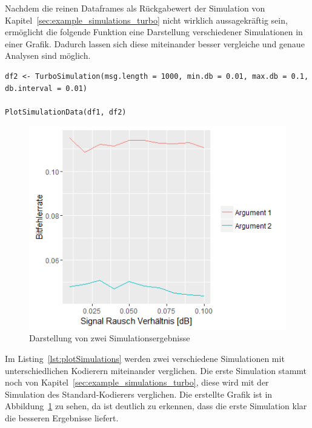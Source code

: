 Nachdem die reinen Dataframes als Rückgabewert der Simulation von Kapitel~\ref{sec:example_simulations_turbo} nicht wirklich aussagekräftig sein, ermöglicht die folgende Funktion eine Darstellung verschiedener Simulationen in einer Grafik. Dadurch lassen sich diese miteinander besser vergleiche und genaue Analysen sind möglich.

\begin{lstlisting}[caption=Vergleich mehrerer Simulationen, label={lst:plotSimulations}, float=!th]
df2 <- TurboSimulation(msg.length = 1000, min.db = 0.01, max.db = 0.1, db.interval = 0.01)

PlotSimulationData(df1, df2)
\end{lstlisting}

\begin{figure}[ht]
\centering
\includegraphics[width=\ScaleIfNeeded]{pictures/PlotSimulations}
\caption{Darstellung von zwei Simulationsergebnisse}
\label{pic:plotSimulations}
\end{figure}

Im Listing~\ref{lst:plotSimulations} werden zwei verschiedene Simulationen mit unterschiedlichen Kodierern miteinander verglichen. Die erste Simulation stammt noch von Kapitel~\ref{sec:example_simulations_turbo}, diese wird mit der Simulation des Standard-Kodierers verglichen. Die erstellte Grafik ist in Abbildung~\ref{pic:plotSimulations} zu sehen, da ist deutlich zu erkennen, dass die erste Simulation klar die besseren Ergebnisse liefert.

\FloatBarrier